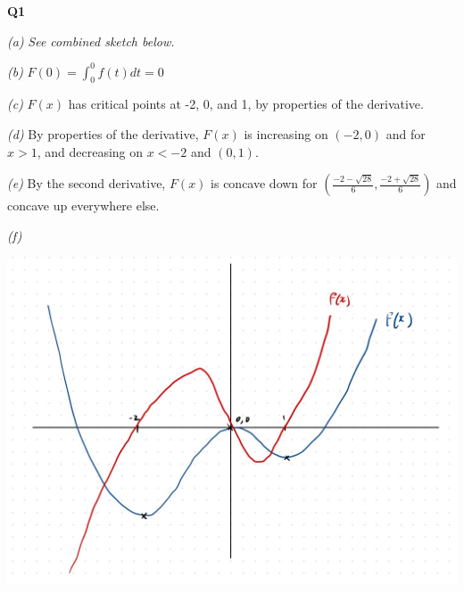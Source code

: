 \documentclass[12pt, a4paper]{article}
\begin{document}
\textbf{Q1}

\textit{(a)} \textit{See combined sketch below.}

\textit{(b)} $F(0) = \int_{0}^{0} f(t) dt = 0$

\textit{(c)} $F(x)$ has critical points at -2, 0, and 1, by properties
of the derivative.

\textit{(d)} By properties of the derivative, $F(x)$ is increasing on
$(-2, 0)$ and for $x > 1$, and decreasing on $x < -2$ and $(0, 1)$.

\textit{(e)} By the second derivative, $F(x)$ is concave down for
$(\frac{-2 - \sqrt{28}}{6}, \frac{-2 + \sqrt{28}}{6})$ and
concave up everywhere else.

\textit{(f)}

\includegraphics[width=\textwidth]{q1sketch.jpg}
\end{document}
